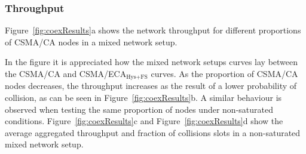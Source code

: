 	\subsubsection{Throughput}
	
	Figure~\ref{fig:coexResults}a shows the network throughput for different proportions of CSMA/CA nodes in a mixed network setup.
	
%	
%	
%	
%	
	
	In the figure it is appreciated how the mixed network setups curves lay between the CSMA/CA and CSMA/ECA$_{\text{Hys+FS}}$ curves. As the proportion of CSMA/CA nodes decreases, the throughput increases as the result of a lower probability of collision, as can be seen in Figure~\ref{fig:coexResults}b. A similar behaviour is observed when testing the same proportion of nodes under non-saturated conditions. Figure~\ref{fig:coexResults}c and Figure~\ref{fig:coexResults}d show the average aggregated throughput and fraction of collisions slots in a non-saturated mixed network setup.
	
